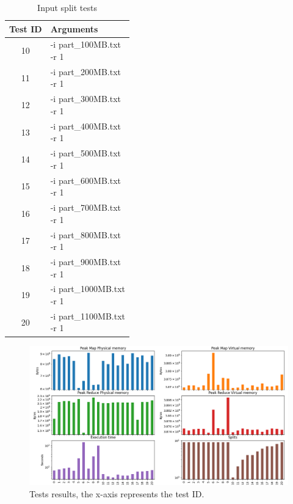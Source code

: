 \documentclass{article}
\begin{document}
\begin{multicols}{2}
\begin{table}[H]
\begin{tabular}{|c|l|}
        Test ID & Arguments \\
        \hline
        10 & \makecell[l]{-i part\_100MB.txt \\ -r 1} \\  
        \hline      
        11 & \makecell[l]{-i part\_200MB.txt \\ -r 1} \\  
        \hline      
        12 & \makecell[l]{-i part\_300MB.txt \\ -r 1} \\        
        \hline
        13 & \makecell[l]{-i part\_400MB.txt \\ -r 1} \\        
        \hline
        14 & \makecell[l]{-i part\_500MB.txt \\ -r 1} \\        
        \hline
        15 & \makecell[l]{-i part\_600MB.txt \\ -r 1} \\        
        \hline
        16 & \makecell[l]{-i part\_700MB.txt \\ -r 1} \\        
        \hline
        17 & \makecell[l]{-i part\_800MB.txt \\ -r 1} \\        
        \hline
        18 & \makecell[l]{-i part\_900MB.txt \\ -r 1} \\        
        \hline
        19 & \makecell[l]{-i part\_1000MB.txt \\ -r 1} \\        
        \hline
        20 & \makecell[l]{-i part\_1100MB.txt \\ -r 1} \\            
        \hline
    \end{tabular}
    \caption{Input split tests}
    \label{tab:input_split_tests}
\end{table}

\end{multicols}
\begin{figure}[H]
    \centering
    \includegraphics[width=1\textwidth]{figures/experiments.png}
    \caption{Tests results, the x-axis represents the test ID.}
    \label{fig:tests_graph}
\end{figure}
\end{document}
